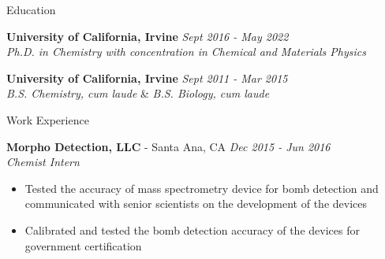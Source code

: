 \documentclass{resume} %
\begin{document}
{\centerline { } }
\vspace{-0.3in}

\begin{rSection}{Education}

{\bf University of California, Irvine} \hfill {\em Sept 2016 - May 2022} 
\\{\textit{Ph.D. in Chemistry with concentration in Chemical and Materials Physics}}

{\bf University of California, Irvine} \hfill {\em Sept 2011 - Mar 2015} 
\\ { \textit{B.S. Chemistry, cum laude}} \& {\textit{B.S. Biology, cum laude}} \hfill

\end{rSection}

\begin{rSection}{Work Experience}
  
  {\bf Morpho Detection, LLC} - Santa Ana, CA \hfill {\em Dec 2015 - Jun 2016}  \\
  {\textit{Chemist Intern}}
  \vspace{-0.5em}
  \begin{itemize}
  \itemsep-0.75em
  \item Tested the accuracy of mass spectrometry device for bomb detection and communicated
    with senior scientists on the development of the devices
  \item Calibrated and tested the bomb detection accuracy of the devices for
    government certification
  \end{itemize}  

\end{rSection}
\end{document}
